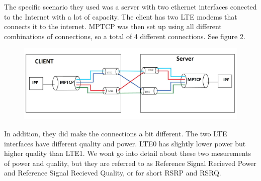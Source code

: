 \documentclass[11pt,twocolumn]{article}
\begin{document}


The specific scenario they used was a server with two ethernet interfaces conected to the Internet with a lot of capacity. The client has two LTE modems that connects it to the internet. MPTCP was then set up using all different combinations of connections, so a total of 4 different connections. See figure 2.
 
\begin{figure}[ht]
\begin{center}
\includegraphics[scale=0.26]{Figure_1}
\end{center}
\end{figure}

In addition, they did make the connections a bit different. The two LTE interfaces have different quality and power. LTE0 has slightly lower power but higher quality than LTE1. We wont go into detail about these two mesurements of power and quality, but they are referred to as Reference Signal Recieved Power and Reference Signal Recieved Quality, or for short RSRP and RSRQ.
\end{document}
